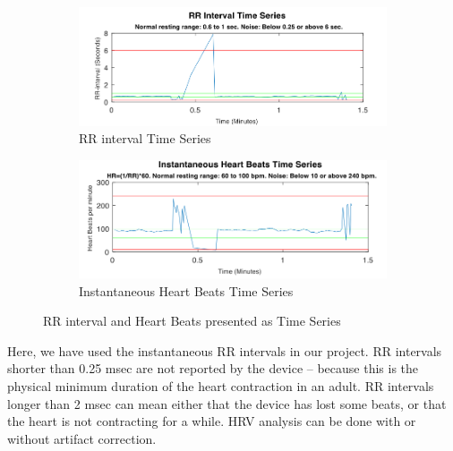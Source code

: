 \documentclass[a4paper, 11pt]{report}\usepackage[]{graphicx}\usepackage[]{color}
\numberwithin{figure}{section}
\begin{document}
\begin{figure}[H]
\centering
\begin{subfigure}[t]{0.47\textwidth}
  \includegraphics[width = \textwidth]{figure/rrTimeSeriesTop}
  \caption{RR interval Time Series}
  \label{fig:rrSeries}
\end{subfigure}
\begin{subfigure}[t]{0.47\textwidth}
  \includegraphics[width = \textwidth]{figure/rrTimeSeriesBottom}
  \caption{Instantaneous Heart Beats Time Series}
  \label{fig:hrSeries}
\end{subfigure}
\caption{RR interval and Heart Beats presented as Time Series}
\label{fig:rr.hrv.timeseries}
\end{figure}

Here, we have used the instantaneous RR intervals in our project. RR intervals shorter than 0.25 msec are not reported by the device – because this is the physical minimum duration of the heart contraction in an adult. RR intervals longer than 2 msec can mean either that the device has lost some beats, or that the heart is not contracting for a while.
HRV analysis can be done with or without artifact correction.
\end{document}
